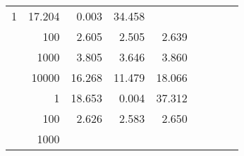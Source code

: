 \begin{table}
\begin{tabular}{rrrrrrrrr}
					\multirow{ 1 }{*}{ 1 } &
					
						
							    
							    
	                           17.204 & 0.003 & 34.458  \\
	                
	            
					 &  
					 
					\multirow{ 1 }{*}{ 100 } &
					
						
							    
							    
	                           2.605 & 2.505 & 2.639  \\
	                
	            
					 &  
					 
					\multirow{ 1 }{*}{ 1000 } &
					
						
							    
							    
	                           3.805 & 3.646 & 3.860  \\
	                
	            
					 &  
					 
					\multirow{ 1 }{*}{ 10000 } &
					
						
							    
							    
	                           16.268 & 11.479 & 18.066  \\
	                
	            
	        
				\noalign{\smallskip}\hline
				\multirow{ 4 }{*}{ 160000 } &
				
					
					 
					\multirow{ 1 }{*}{ 1 } &
					
						
							    
							    
	                           18.653 & 0.004 & 37.312  \\
	                
	            
					 &  
					 
					\multirow{ 1 }{*}{ 100 } &
					
						
							    
							    
	                           2.626 & 2.583 & 2.650  \\
	                
	            
					 &  
					 
					\multirow{ 1 }{*}{ 1000 } &
					
						
							    

\end{tabular}
\end{table}
